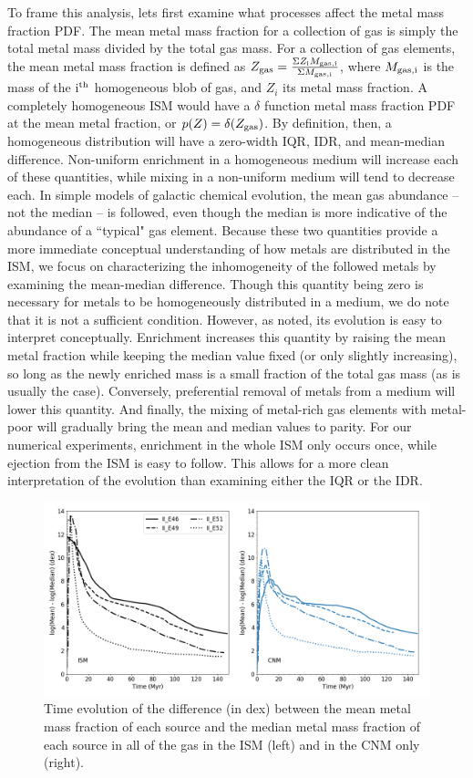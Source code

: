 To frame this analysis, lets first examine what processes affect the metal mass fraction PDF. The mean metal mass fraction for a collection of gas is simply the total metal mass divided by the total gas mass. For a collection of gas elements, the mean metal mass fraction is defined as $Z_{\rm gas} = \frac{ \Sigma Z_{\rm i}M_{\rm gas,i}}{\Sigma M_{\rm gas,i}}$, where $M_{\rm gas,i}$ is the mass of the i$^{\rm th}$ homogeneous blob of gas, and $Z_{i}$ its metal mass fraction. A completely homogeneous ISM would have a $\delta$ function metal mass fraction PDF at the mean metal fraction, or $p(Z) = \delta(Z_{\rm gas})$. By definition, then, a homogeneous distribution will have a zero-width IQR, IDR, and mean-median difference. Non-uniform enrichment in a homogeneous medium will increase each of these quantities, while mixing in a non-uniform medium will tend to decrease each. In simple models of galactic chemical evolution, the mean gas abundance -- not the median -- is followed, even though the median is more indicative of the abundance of a ``typical" gas element. Because these two quantities provide a more immediate conceptual understanding of how metals are distributed in the ISM, we focus on characterizing the inhomogeneity of the followed metals by examining the mean-median difference. Though this quantity being zero is necessary for metals to be homogeneously distributed in a medium, we do note that it is not a sufficient condition. However, as noted, its evolution is easy to interpret conceptually. Enrichment increases this quantity by raising the mean metal fraction while keeping the median value fixed (or only slightly increasing), so long as the newly enriched mass is a small fraction of the total gas mass (as is usually the case). Conversely, preferential removal of metals from a medium will lower this quantity. And finally, the mixing of metal-rich gas elements with metal-poor will gradually bring the mean and median values to parity. For our numerical experiments, enrichment in the whole ISM only occurs once, while ejection from the ISM is easy to follow. This allows for a more clean interpretation of the evolution than examining either the IQR or the IDR.

\begin{figure}
  \centering
  \includegraphics[width=0.75\linewidth]{figures/ch4/ISM_CNM_average_mean-median}
  \caption{Time evolution of the difference (in dex) between the mean metal mass fraction of each source and the median metal mass fraction of each source in all of the gas in the ISM (left) and in the CNM only (right).}
  \label{ch4:fig:CGM_CNM}
\end{figure}

